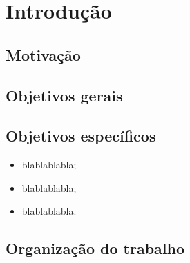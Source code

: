 \chapter{Introdução}



%

\section{Motivação}



\section{Objetivos gerais}


\section{Objetivos específicos}

\begin{itemize}
	\item blablablabla;
    \item blablablabla;
    \item blablablabla.
\end{itemize}

\section{Organização do trabalho}

